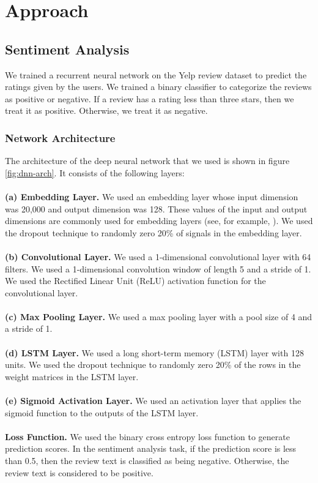 \section{Approach}

\subsection{Sentiment Analysis}

We trained a recurrent neural network on the Yelp review dataset to predict the ratings given by the users. We trained a binary classifier to categorize the reviews as positive or negative. If a review has a rating less than three stars, then we treat it as positive. Otherwise, we treat it as negative.

\subsubsection{Network Architecture}

The architecture of the deep neural network that we used is shown in figure \ref{fig:dnn-arch}. It consists of the following layers:
\\ \\
\textbf{(a) Embedding Layer.} We used an embedding layer whose input dimension was 20,000 and output dimension was 128. These values of the input and output dimensions are commonly used for embedding layers (see, for example, \cite{Lu2017}). We used the dropout technique \cite{ZarembaSV2014} to randomly zero 20\% of signals in the embedding layer.
\\ \\
\textbf{(b) Convolutional Layer.} We used a 1-dimensional convolutional layer with 64 filters. We used a 1-dimensional convolution window of length 5 and a stride of 1. We used the Rectified Linear Unit (ReLU) activation function for the convolutional layer.
\\ \\
\textbf{(c) Max Pooling Layer.} We used a max pooling layer with a pool size of 4 and a stride of 1.
\\ \\
\textbf{(d) LSTM Layer.} We used a long short-term memory (LSTM) layer with 128 units. We used the dropout technique \cite{ZarembaSV2014} to randomly zero 20\% of the rows in the weight matrices in the LSTM layer.
\\ \\
\textbf{(e) Sigmoid Activation Layer.} We used an activation layer that applies the sigmoid function to the outputs of the LSTM layer.
\\ \\
\textbf{Loss Function.} We used the binary cross entropy loss function to generate prediction scores. In the sentiment analysis task, if the prediction score is less than 0.5, then the review text is classified as being negative. Otherwise, the review text is considered to be positive.

